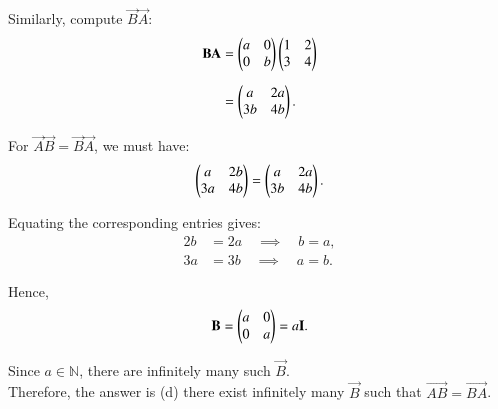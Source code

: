 \documentclass[journal]{IEEEtran}
\begin{document}
Similarly, compute $\vec{B}\vec{A}$:
\begin{align}
\mathbf{B}\mathbf{A} 
&= \begin{pmatrix}a & 0 \\ 0 & b\end{pmatrix} \begin{pmatrix}1 & 2 \\ 3 & 4\end{pmatrix} \\[6pt]
&= \begin{pmatrix}a & 2a \\ 3b & 4b\end{pmatrix}.
\end{align}

For $\vec{A}\vec{B} = \vec{B}\vec{A}$, we must have:
\begin{align}
\begin{pmatrix}a & 2b \\ 3a & 4b\end{pmatrix} = \begin{pmatrix}a & 2a \\ 3b & 4b\end{pmatrix}.
\end{align}

Equating the corresponding entries gives:
\begin{align}
2b &= 2a \quad \implies \quad b = a, \\[6pt]
3a &= 3b \quad \implies \quad a = b.
\end{align}

Hence, 
\begin{align}
\mathbf{B} = \begin{pmatrix}a & 0 \\ 0 & a\end{pmatrix} = a\mathbf{I}.
\end{align}

Since $a \in \mathbb{N}$, there are infinitely many such $\vec{B}$.\\
Therefore, the answer is (d) there exist infinitely many $\vec{B}$ such that $\vec{AB} = \vec{BA}$.
\end{document}
